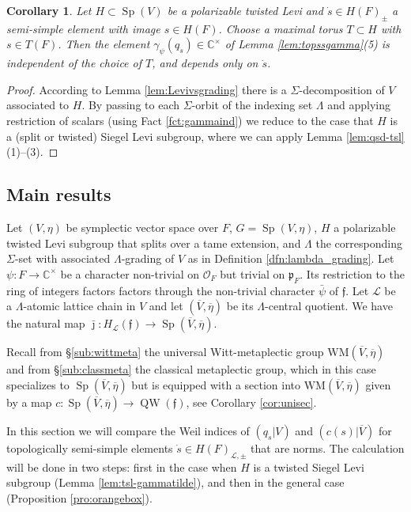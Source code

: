 \documentclass{article}
\def\mf#1{\mathfrak{#1}}
\def\mc#1{\mathcal{#1}}
\def\C{\mathbb{C}}
\def\ol#1{\overline{#1}}
\def\cO{\mathcal{O}}
\DeclareMathOperator{\Sp}{Sp}
\newtheorem{cor}[thm]{Corollary}
\theoremstyle{definition}
\numberwithin{equation}{subsection}
\renewcommand{\-}{\hyp{}}
\newcommand{\WMuniv}{\mathrm{WM}}
\DeclareMathOperator{\QW}{QW}
\newcommand{\rf}{\mathfrak{f}}
\newcommand{\oVS}{\overline{V}}
\begin{document}
\begin{cor} \label{cor:topsgamma-1}
	Let $H \subset \Sp(V)$ be a polarizable twisted Levi and $\dot s \in H(F)_\pm$ a semi-simple element with image $s \in H(F)$. Choose a maximal torus $T \subset H$ with $s \in T(F)$. Then the element $\gamma_\psi(q_{\dot s}) \in \C^\times$ of Lemma \ref{lem:topssgamma}(5) is independent of the choice of $T$, and depends only on $\dot s$.
\end{cor}
\begin{proof}
	According to Lemma \ref{lem:Levivsgrading} there is a $\Sigma$-decomposition of $V$ associated to $H$. By passing to each $\Sigma$-orbit of the indexing set $\Lambda$ and applying restriction of scalars (using Fact \ref{fct:gammaind}) we reduce to the case that $H$ is a (split or twisted) Siegel Levi subgroup, where we can apply Lemma \ref{lem:qsd-tsl}(1)--(3).
\end{proof}



\subsection{Main results} \label{sub:sympmain}

Let $(V,\eta)$ be symplectic vector space over $F$, $G=\Sp(V,\eta)$, $H$ a polarizable twisted Levi subgroup that splits over a tame extension, and $\Lambda$ the corresponding $\Sigma$-set with associated $\Lambda$-grading of $V$ as in Definition \ref{dfn:lambda_grading}. Let $\psi : F \to \C^\times$ be a character non-trivial on $\cO_F$ but trivial on $\mf{p}_F$. Its restriction to the ring of integers factors factors through the non-trivial character $\bar\psi$ of $\rf$.
Let $\mc{L}$ be a $\Lambda$-atomic lattice chain in $V$ and let $(\oVS,\ol{\eta})$ be its $\Lambda$-central quotient.  
We have the natural map $\bar\jmath : H_\mc{L}(\rf) \to \Sp(\oVS,\ol{\eta})$.

Recall from \S\ref{sub:wittmeta} the universal Witt-metaplectic group $\WMuniv(\oVS,\ol{\eta})$ and from \S\ref{sub:classmeta} the classical metaplectic group, which in this case specializes to $\Sp(\oVS,\ol{\eta})$ but is equipped with a section into $\WMuniv(\oVS,\ol{\eta})$ given by a map $c : \Sp(\oVS,\ol{\eta}) \to \QW(\rf)$, see Corollary \ref{cor:unisec}.

In this section we will compare the Weil indices of $(q_{\dot s}|V)$ and $(c(s)|\oVS)$ for topologically semi-simple elements $\dot s \in H(F)_{\mc{L},\pm}$ that are norms. The calculation will be done in two steps: first in the case when $H$ is a twisted Siegel Levi subgroup (Lemma \ref{lem:tsl-gammatilde}), and then in the general case (Proposition \ref{pro:orangebox}).
\end{document}
